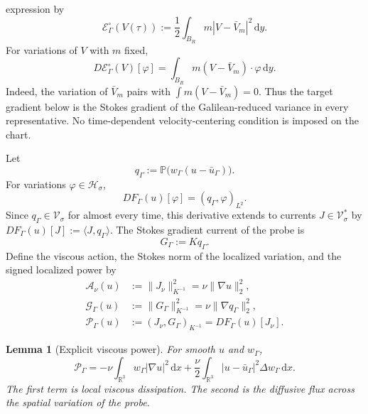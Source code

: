 \documentclass[11pt]{amsart}
\numberwithin{equation}{section}
\theoremstyle{plain}
\newtheorem{lemma}[lemma]{Lemma}
\theoremstyle{definition}
\theoremstyle{remark}
\newcommand{\R}{\mathbb R}
\newcommand{\dd}{\,\mathrm d}
\newcommand{\Pdiv}{\mathbb P}
\newcommand{\Action}{\mathcal A}
\newcommand{\ProbeDirichlet}{\mathcal G}
\newcommand{\Power}{\mathcal P}
\newcommand{\OscEnergy}{\mathcal E^{\circ}}
\begin{document}
expression by
\begin{equation}\label{eq:oscillatory-probe}
 \OscEnergy_\Gamma(V(\tau))
 :=\frac12\int_{B_R}m|V-\bar V_m|^2\dd y.
\end{equation}
For variations of \(V\) with \(m\) fixed,
\begin{equation}\label{eq:oscillatory-gradient}
 D\OscEnergy_\Gamma(V)[\varphi]
 =\int_{B_R}m(V-\bar V_m)\cdot\varphi\dd y.
\end{equation}
Indeed, the variation of \(\bar V_m\) pairs with
\(\int m(V-\bar V_m)=0\).  Thus the target gradient below is the Stokes
gradient of the Galilean-reduced variance in every representative.  No
time-dependent velocity-centering condition is imposed on the chart.

Let
\begin{equation}\label{eq:q-def}
 q_\Gamma:=\Pdiv\bigl(w_\Gamma(u-\bar u_\Gamma)\bigr).
\end{equation}
For variations \(\varphi\in\mathcal H_\sigma\),
\[
 D F_\Gamma(u)[\varphi]=(q_\Gamma,\varphi)_{L^2}.
\]
Since \(q_\Gamma\in\mathcal V_\sigma\) for almost every time, this derivative
extends to currents \(J\in\mathcal V_\sigma^*\) by
\(D F_\Gamma(u)[J]:=\langle J,q_\Gamma\rangle\).
The Stokes gradient current of the probe is
\begin{equation}\label{eq:target-gradient-current}
 G_\Gamma:=Kq_\Gamma.
\end{equation}
Define the viscous action, the Stokes norm of the localized variation, and
the signed localized power by
\begin{align}
 \Action_\nu(u)
 &:=\|J_\nu\|_{K^{-1}}^2
 =\nu\|\nabla u\|_2^2,\label{eq:viscous-action}\\
 \ProbeDirichlet_\Gamma(u)
 &:=\|G_\Gamma\|_{K^{-1}}^2
 =\nu\|\nabla q_\Gamma\|_2^2,\label{eq:localized-variation-energy}\\
 \Power_\Gamma(u)
 &:=(J_\nu,G_\Gamma)_{K^{-1}}
 =D F_\Gamma(u)[J_\nu].\label{eq:target-power}
\end{align}

\begin{lemma}[Explicit viscous power]
\label{lem:explicit-power}
For smooth \(u\) and \(w_\Gamma\),
\begin{equation}\label{eq:explicit-power}
 \Power_\Gamma
 =-\nu\int_{\R^3}w_\Gamma|\nabla u|^2\dd x
 +\frac\nu2\int_{\R^3}|u-\bar u_\Gamma|^2
       \Delta w_\Gamma\dd x.
\end{equation}
The first term is local viscous dissipation.  The second is the diffusive
flux across the spatial variation of the probe.
\end{lemma}
\end{document}

